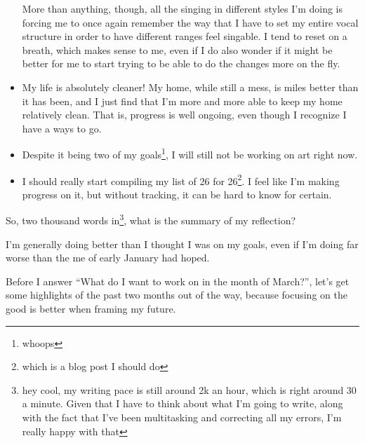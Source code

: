 \documentclass[12pt]{article}[titlepage]
\newcommand{\say}[1]{``#1''}
\renewcommand{\,}{\textsuperscript{,}}
\begin{document}
\begin{itemize}
More than anything, though, all the singing in different styles I'm doing is forcing me to once again remember the way that I have to set my entire vocal structure in order to have different ranges feel singable. I tend to reset on a breath, which makes sense to me, even if I do also wonder if it might be better for me to start trying to be able to do the changes more on the fly.

\item My life is absolutely cleaner! My home, while still a mess, is miles better than it has been, and I just find that I'm more and more able to keep my home relatively clean. That is, progress is well ongoing, even though I recognize I have a ways to go.  
\item Despite it being two of my goals\footnote{whoops}, I will still not be working on art right now.  
\item I should really start compiling my list of 26 for 26\footnote{which is a blog post I should do}. I feel like I'm making progress on it, but without tracking, it can be hard to know for certain.  
\end{itemize}

So, two thousand words in\footnote{hey cool, my writing pace is still around 2k an hour, which is right around 30 a minute. Given that I have to think about what I'm going to write, along with the fact that I've been multitasking and correcting all my errors, I'm really happy with that}, what is the summary of my reflection?

I'm generally doing better than I thought I was on my goals, even if I'm doing far worse than the me of early January had hoped.

Before I answer \say{What do I want to work on in the month of March?}, let's get some highlights of the past two months out of the way, because focusing on the good is better when framing my future.
\end{document}
